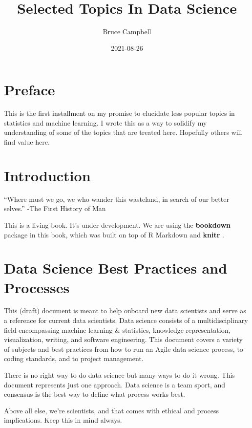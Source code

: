 \documentclass[
  11pt,
]{book}
\title{Selected Topics In Data Science}
\author{Bruce Campbell}
\date{2021-08-26}
\begin{document}
\maketitle

\hypertarget{preface}{%
\chapter{Preface}\label{preface}}

This is the first installment on my promise to elucidate less popular topics in statistics and machine learning. I wrote this as a way to solidify my understanding of some of the topics that are treated here. Hopefully others will find value here.

\hypertarget{intro}{%
\chapter{Introduction}\label{intro}}

``Where must we go, we who wander this wasteland, in search of our better selves.'' -The First History of Man

This is a living book. It's under development. We are using the \textbf{bookdown} package \citep{R-bookdown} in this book, which was built on top of R Markdown and \textbf{knitr} \citep{xie2015}.

\hypertarget{data-science-best-practices-and-processes}{%
\chapter{Data Science Best Practices and Processes}\label{data-science-best-practices-and-processes}}

This (draft) document is meant to help onboard new data scientists and serve as a reference for current data scientists. Data science consists of a multidisciplinary field encompassing machine learning \& statistics, knowledge representation, visualization, writing, and software engineering. This document covers a variety of subjects and best practices from how to run an Agile data science process, to coding standards, and to project management.

There is no right way to do data science but many ways to do it wrong. This document represents just one approach. Data science is a team sport, and consensus is the best way to define what process works best.

Above all else, we're scientists, and that comes with ethical and process implications. Keep this in mind always.
\end{document}
